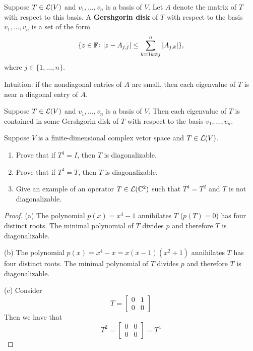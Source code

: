 \documentclass{extarticle}
\begin{document}
\begin{definition}
    Suppose \(T \in \mathcal{L}(V)\) and \(v_1, \ldots, v_n\) is a basis of \(V\). Let \(A\) denote the matrix 
    of \(T\) with respect to this basis. A \textbf{Gershgorin disk} of \(T\) with respect to the basis 
    \(v_1, \ldots, v_n\) is a set of the form 
    \[\{z \in \mathbb{F} \colon |z - A_{j,j}| \leq \sum_{k=1 k \neq j}^{n} |A_{j,k}| \},\]
    where \(j \in \{1, \ldots, n\}.\)
\end{definition}

\begin{remark}
    Intuition: if the nondiagonal entries of \(A\) are small, then each eigenvalue of \(T\) is near 
    a diagonal entry of \(A\).
\end{remark}

\begin{thm}
    Suppose \(T \in \mathcal{L}(V)\) and \(v_1, \ldots, v_n\) is a basis of \(V\). Then each eigenvalue of \(T\)
    is contained in some Gershgorin disk of \(T\) with respect to the basis \(v_1, \ldots, v_n\).
\end{thm}


\newpage 
{}

\begin{problem}{1}
    Suppose \(V\) is a finite-dimensional complex vetor space and \(T \in \mathcal{L}(V)\). 
    \begin{enumerate}[label=(\alph*)]
        \item Prove that if \(T^4 = I\), then \(T\) is diagonalizable. 
        \item Prove that if \(T^4 = T\), then \(T\) is diagonalizable. 
        \item Give an example of an operator \(T \in \mathcal{L}(\mathbb{C}^2)\) such that \(T^4 = T^2\) and \(T\) is not 
        diagonalizable.
    \end{enumerate} 
\end{problem}

\begin{proof}
(a) The polynomial \(p(x) = x^4 - 1\) annihilates \(T\) (\(p(T) = 0\)) has four distinct roots. The minimal 
polynomial of \(T\) divides \(p\) and therefore \(T\) is diagonalizable. 

(b) The polynomial \(p(x) = x^4 - x = x(x-1)(x^2 +1)\) annihilates \(T\) has four distinct roots. The minimal 
polynomial of \(T\) divides \(p\) and therefore \(T\) is diagonalizable. 

(c) Consider 
\[T = \begin{bmatrix}
    0 & 1 \\ 
    0 & 0
\end{bmatrix}\]
Then we have that 
\[T^2 = \begin{bmatrix}
    0 & 0 \\ 
    0 & 0
\end{bmatrix} =  T^4 \]
\end{proof}
\end{document}
